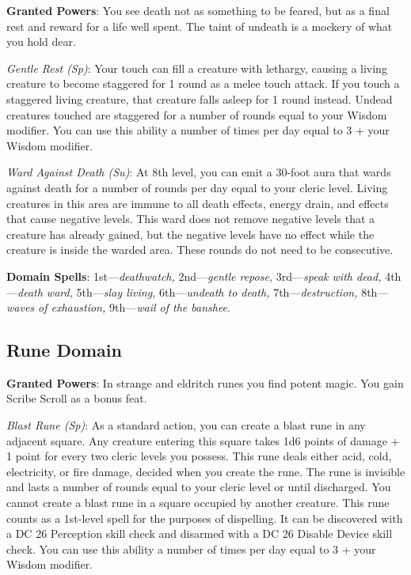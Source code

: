				
\textbf{Granted Powers}: You see death not as something to be feared, but as a final rest and reward for a life well spent. The taint of undeath is a mockery of what you hold dear.
				
\textit{Gentle Rest (Sp)}: Your touch can fill a creature with lethargy, causing a living creature to become staggered for 1 round as a melee touch attack. If you touch a staggered living creature, that creature falls asleep for 1 round instead. Undead creatures touched are staggered for a number of rounds equal to your Wisdom modifier. You can use this ability a number of times per day equal to 3 + your Wisdom modifier.
				
\textit{Ward Against Death (Su)}: At 8th level, you can emit a 30-foot aura that wards against death for a number of rounds per day equal to your cleric level. Living creatures in this area are immune to all death effects, energy drain, and effects that cause negative levels. This ward does not remove negative levels that a creature has already gained, but the negative levels have no effect while the creature is inside the warded area. These rounds do not need to be consecutive.
				
\textbf{Domain Spells}: 1st---\textit{deathwatch, }2nd---\textit{gentle repose,} 3rd---\textit{speak with dead, }4th---\textit{death ward, }5th---\textit{slay living, }6th---\textit{undeath to death, }7th---\textit{destruction, }8th---\textit{waves of exhaustion, }9th---\textit{wail of the banshee}.
				
\subsection{Rune Domain}

				
\textbf{Granted Powers}: In strange and eldritch runes you find potent magic. You gain Scribe Scroll as a bonus feat.
				
\textit{Blast Rune (Sp)}: As a standard action, you can create a blast rune in any adjacent square. Any creature entering this square takes 1d6 points of damage + 1 point for every two cleric levels you possess. This rune deals either acid, cold, electricity, or fire damage, decided when you create the rune. The rune is invisible and lasts a number of rounds equal to your cleric level or until discharged. You cannot create a blast rune in a square occupied by another creature. This rune counts as a 1st-level spell for the purposes of dispelling. It can be discovered with a DC 26 Perception skill check and disarmed with a DC 26 Disable Device skill check. You can use this ability a number of times per day equal to 3 + your Wisdom modifier.
				
